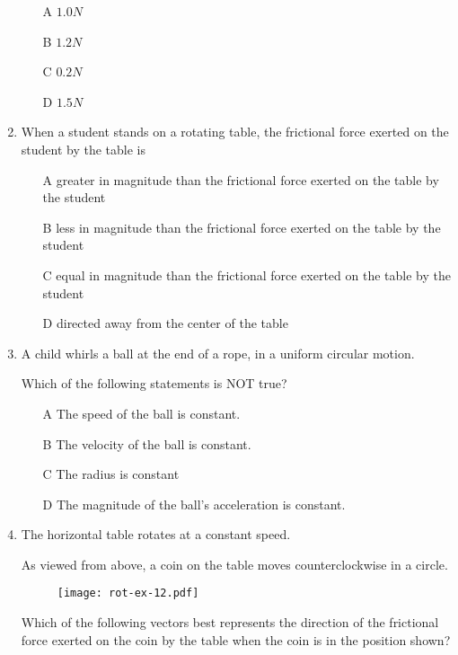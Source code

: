 \begin{enumerate}
\begin{itemize}
\item[A] $1.0 N$
\item[B] $1.2 N$
\item[C] $0.2 N$
\item[D] $1.5 N$
\end{itemize}


\item When a student stands on a rotating table, the frictional force exerted on the student by the table is

\begin{itemize}
\item[A] greater in magnitude than the frictional force exerted on the table by the student
\item[B] less in magnitude than the frictional force exerted on the table by the student
\item[C] equal in magnitude than the frictional force exerted on the table by the student
\item[D] directed away from the center of the table
\end{itemize}


\item A child whirls a ball at the end of a rope, in a uniform circular motion. 

Which of the following statements is NOT true?

\begin{itemize}
\item[A] The speed of the ball is constant.
\item[B] The velocity of the ball is constant.
\item[C] The radius is constant
\item[D] The magnitude of the ball’s acceleration is constant.
\end{itemize}



\item The horizontal table rotates at a constant speed. 

As viewed from above, a coin on the table moves counterclockwise in a circle.



\begin{figure}[H]
\centering
\texttt{[image: rot-ex-12.pdf]}
\end{figure}

Which of the following vectors best represents the direction of the frictional force 
exerted on the coin by the table when the coin is in the position shown?


\end{enumerate}
